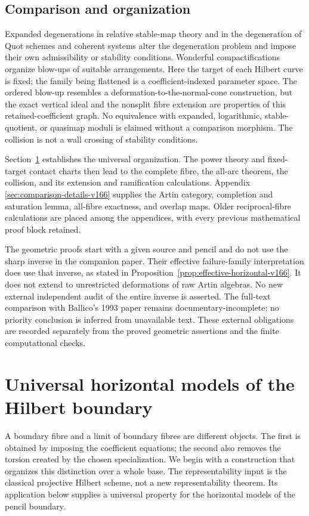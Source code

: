 \documentclass[11pt,reqno]{amsart}
\numberwithin{equation}{section}
\theoremstyle{definition}\newtheorem{definition}[theorem]{Definition}
\theoremstyle{remark}\newtheorem{remark}[theorem]{Remark}
\begin{document}
\subsection{Comparison and organization}
Expanded degenerations in relative stable-map theory
\cite{JunLi166} and in the degeneration of Quot schemes and
coherent systems \cite{LiWu166} alter the degeneration problem and
impose their own admissibility or stability conditions. Wonderful
compactifications \cite{Li2009v161} organize blow-ups of suitable
arrangements. Here the target of each Hilbert curve is fixed; the
family being flattened is a coefficient-indexed parameter space.
The ordered blow-up resembles a deformation-to-the-normal-cone
construction, but the exact vertical ideal and the nonsplit fibre
extension are properties of this retained-coefficient graph.
No equivalence with expanded, logarithmic, stable-quotient, or
quasimap moduli is claimed without a comparison morphism. The
collision is not a wall crossing of stability conditions.

Section~\ref{sec:horizontal-v166} establishes the universal
organization. The power theory and fixed-target contact charts
then lead to the complete fibre, the all-arc theorem, the collision,
and its extension and ramification calculations. Appendix
\ref{sec:comparison-details-v166} supplies the Artin category,
completion and saturation lemma, all-fibre exactness, and overlap
maps. Older reciprocal-fibre calculations are placed among the
appendices, with every previous mathematical proof block retained.

The geometric proofs start with a given source and pencil and do
not use the sharp inverse in the companion paper. Their effective
failure-family interpretation does use that inverse, as stated in
Proposition~\ref{prop:effective-horizontal-v166}. It does not extend
to unrestricted deformations of raw Artin algebras. No new external
independent audit of the entire inverse is asserted. The full-text
comparison with Ballico's 1993 paper remains documentary-incomplete;
no priority conclusion is inferred from unavailable text. These
external obligations are recorded separately from the proved
geometric assertions and the finite computational checks.

\section{Universal horizontal models of the Hilbert boundary}
\label{sec:horizontal-v166}
A boundary fibre and a limit of boundary fibres are different objects.
The first is obtained by imposing the coefficient equations; the second
also removes the torsion created by the chosen specialization. We begin
with a construction that organizes this distinction over a whole base.
The representability input is the classical projective Hilbert scheme,
not a new representability theorem. Its application below supplies a
universal property for the horizontal models of the pencil boundary.
\end{document}
